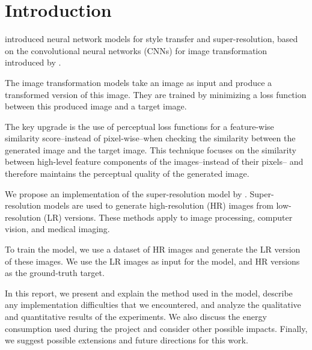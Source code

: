 \documentclass{article}
\begin{document}
{
    \section{Introduction}
    \label{sec:introduction}

    \cite{sr} introduced neural network models for style transfer and super-resolution, based on the convolutional neural networks (CNNs) for image transformation introduced by \cite{image-transform-network}.

    The image transformation models take an image as input and produce a transformed version of this image. They are trained by minimizing a loss function between this produced image and a target image.

    The key upgrade is the use of perceptual loss functions for a feature-wise similarity score--instead of pixel-wise--when checking the similarity between the generated image and the target image. This technique focuses on the similarity between high-level feature components of the images--instead of their pixels-- and therefore maintains the perceptual quality of the generated image.

    \bigskip

    We propose an implementation of the super-resolution model by \cite{sr}. Super-resolution models are used to generate high-resolution (HR) images from low-resolution (LR) versions. These methods apply to image processing, computer vision, and medical imaging.

    To train the model, we use a dataset of HR images and generate the LR version of these images. We use the LR images as input for the model, and HR versions as the ground-truth target.

    \bigskip

    In this report, we present and explain the method used in the model, describe any implementation difficulties that we encountered, and analyze the qualitative and quantitative results of the experiments. We also discuss the energy consumption used during the project and consider other possible impacts. Finally, we suggest possible extensions and future directions for this work.
}
\end{document}
